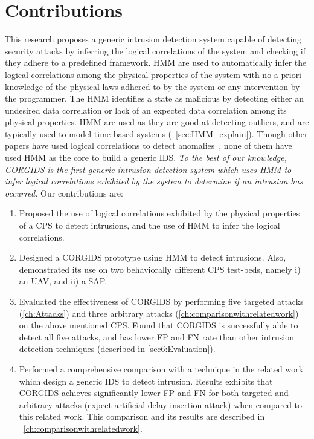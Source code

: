 \section{Contributions}
\label{sec:Contributions}

This research proposes a generic intrusion detection system capable of detecting security attacks by inferring the logical correlations of the system and checking if they adhere to a predefined framework. \ac{HMM}  are used to automatically infer the logical correlations among the physical properties of the system with no a priori knowledge of the physical laws adhered to by the system or any intervention by the programmer. The \ac{HMM} identifies a state as malicious by detecting either an undesired data correlation or lack of an expected data correlation among its physical properties. \ac{HMM} are used as they are good at detecting outliers, and are typically used to model time-based systems (~\autoref{sec:HMM_explain}).  
Though other papers have used logical correlations to detect anomalies~\cite{iturbe2017feasibility,krotofil2015process,chen2018learning,zohrevand2016hidden}, none of them have used \ac{HMM} as the core to build a generic \ac{IDS}. \textit{To the best of our knowledge, \ac{CORGIDS} is the first generic intrusion detection system which uses \ac{HMM} to infer logical correlations exhibited by the system to determine if an intrusion has occurred.} Our contributions are:

\begin{enumerate}

\item Proposed the use of logical correlations exhibited by the physical properties of a \ac{CPS} to detect intrusions, and the use of \acf{HMM} to infer the logical correlations.

\item Designed a \acf{CORGIDS} prototype using \acf{HMM} to detect intrusions. Also, demonstrated its use on two behaviorally different \ac{CPS} test-beds, namely i) an \ac{UAV}, and ii) a \acf{SAP}.

\item Evaluated the effectiveness of \ac{CORGIDS} by performing five targeted attacks (\autoref{ch:Attacks}) and three arbitrary attacks (\autoref{ch:comparisonwithrelatedwork}) on the above mentioned \ac{CPS}. Found that \ac{CORGIDS} is successfully able to detect all five attacks, and has lower \acf{FP} and \acf{FN} rate than other intrusion detection techniques (described in \autoref{sec6:Evaluation}).

\item Performed a comprehensive comparison with a technique in the related work which design a generic IDS to detect intrusion. Results exhibits that \ac{CORGIDS} achieves significantly lower \ac{FP} and \ac{FN} for both targeted and arbitrary attacks (expect artificial delay insertion attack) when compared to this related work. This comparison and its results are described in ~\autoref{ch:comparisonwithrelatedwork}.


\end{enumerate}

